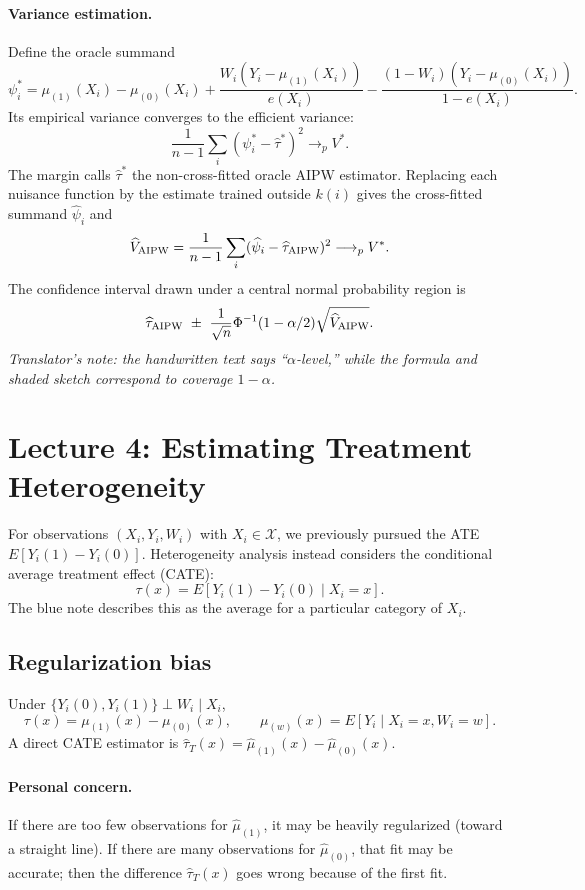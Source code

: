 \paragraph{Variance estimation.}
Define the oracle summand
\[
\psi_i^*=\mu_{(1)}(X_i)-\mu_{(0)}(X_i)
+\frac{W_i(Y_i-\mu_{(1)}(X_i))}{e(X_i)}
-\frac{(1-W_i)(Y_i-\mu_{(0)}(X_i))}{1-e(X_i)}.
\]
Its empirical variance converges to the efficient variance:
\[
\frac1{n-1}\sum_i(\psi_i^*-\widehat\tau^*)^2\longrightarrow_p V^*.
\]
The margin calls $\widehat\tau^*$ the non-cross-fitted oracle AIPW estimator. Replacing each nuisance function by the estimate trained outside $k(i)$ gives the cross-fitted summand $\widehat\psi_i$ and
\[
\widehat V_{\rm AIPW}=\frac1{n-1}\sum_i(\widehat\psi_i-\widehat\tau_{\rm AIPW})^2\longrightarrow_p V^*.
\]
The confidence interval drawn under a central normal probability region is
\[
\widehat\tau_{\rm AIPW}\ \pm\ \frac1{\sqrt n}\Phi^{-1}(1-\alpha/2)\sqrt{\widehat V_{\rm AIPW}}.
\]
\textit{Translator's note: the handwritten text says ``$\alpha$-level,'' while the formula and shaded sketch correspond to coverage $1-\alpha$.}
\section{Lecture 4: Estimating Treatment Heterogeneity}
For observations $(X_i,Y_i,W_i)$ with $X_i\in\mathcal X$, we previously pursued the ATE $E[Y_i(1)-Y_i(0)]$. Heterogeneity analysis instead considers the conditional average treatment effect (CATE):
\[
\tau(x)=E[Y_i(1)-Y_i(0)\mid X_i=x].
\]
The blue note describes this as the average for a particular category of $X_i$.
\subsection{Regularization bias}
Under $\{Y_i(0),Y_i(1)\}\perp W_i\mid X_i$,
\[
\tau(x)=\mu_{(1)}(x)-\mu_{(0)}(x),\qquad
\mu_{(w)}(x)=E[Y_i\mid X_i=x,W_i=w].
\]
A direct CATE estimator is $\widehat\tau_T(x)=\widehat\mu_{(1)}(x)-\widehat\mu_{(0)}(x)$.
\paragraph{Personal concern.}
If there are too few observations for $\widehat\mu_{(1)}$, it may be heavily regularized (toward a straight line). If there are many observations for $\widehat\mu_{(0)}$, that fit may be accurate; then the difference $\widehat\tau_T(x)$ goes wrong because of the first fit.
